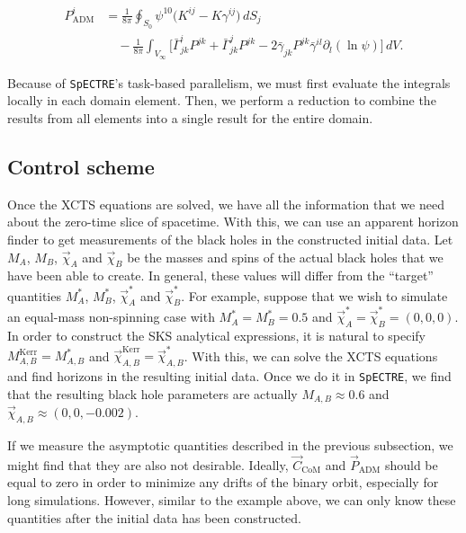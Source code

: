 \documentclass{../document}
\begin{document}
      \begin{equation} \label{eq:Padm-mixed}
        \begin{aligned}
          P_\text{ADM}^i
          &= \frac{1}{8\pi}
              \oint_{S_0} \psi^{10} \Big(
                K^{ij} - K \gamma^{ij}
              \Big) \, dS_j \\
            &\quad - \frac{1}{8\pi}
              \int_{V_\infty} \Big[
                \bar\Gamma^i_{jk} P^{jk}
                + \bar\Gamma^j_{jk} P^{jk}
                - 2 \bar\gamma_{jk} P^{jk} \bar\gamma^{il}
                                          \partial_l(\ln\psi)
              \Big] \, dV.
        \end{aligned}
      \end{equation}

      Because of {\tt SpECTRE}'s task-based parallelism, we must first evaluate the integrals locally in each domain element. Then, we perform a reduction to combine the results from all elements into a single result for the entire domain.

    \subsection{Control scheme}
      
      Once the XCTS equations are solved, we have all the information that we need about the zero-time slice of spacetime. With this, we can use an apparent horizon finder to get measurements of the black holes in the constructed initial data. Let $M_A$, $M_B$, $\vec\chi_{A}$ and $\vec\chi_{B}$ be the masses and spins of the actual black holes that we have been able to create. In general, these values will differ from the ``target'' quantities $M^*_A$, $M^*_B$, $\vec\chi^*_{A}$ and $\vec\chi^*_{B}$. For example, suppose that we wish to simulate an equal-mass non-spinning case with $M^*_A = M^*_B = 0.5$ and $\vec\chi^*_{A} = \vec\chi^*_{B} = (0,0,0)$. In order to construct the SKS analytical expressions, it is natural to specify $M^\text{Kerr}_{A,B} = M^*_{A,B}$ and $\vec\chi^\text{Kerr}_{A,B} = \vec\chi^*_{A,B}$. With this, we can solve the XCTS equations and find horizons in the resulting initial data. Once we do it in {\tt SpECTRE}, we find that the resulting black hole parameters are actually $M_{A,B} \approx 0.6$ and $\vec\chi_{A,B} \approx (0,0,-0.002)$.

      If we measure the asymptotic quantities described in the previous subsection, we might find that they are also not desirable. Ideally, $\vec C_\text{CoM}$ and $\vec P_\text{ADM}$ should be equal to zero in order to minimize any drifts of the binary orbit, especially for long simulations. However, similar to the example above, we can only know these quantities after the initial data has been constructed.
\end{document}
